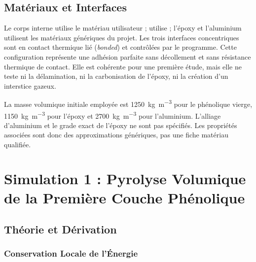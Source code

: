 \documentclass[oneside,openany]{amsdtx}
\begin{document}
\subsection{Matériaux et Interfaces}

Le corps interne  utilise le matériau utilisateur
;  utilise ; l'époxy
et l'aluminium utilisent les matériaux génériques du projet. Les trois
interfaces concentriques sont en contact thermique lié (\emph{bonded}) et
contrôlées par le programme. Cette configuration représente une adhésion parfaite
sans décollement et sans résistance thermique de contact. Elle est cohérente
pour une première étude, mais elle ne teste ni la délamination, ni la
carbonisation de l'époxy, ni la création d'un interstice gazeux.

La masse volumique initiale employée est \SI{1250}{kg.m^{-3}} pour le phénolique
vierge, \SI{1150}{kg.m^{-3}} pour l'époxy et \SI{2700}{kg.m^{-3}} pour
l'aluminium. L'alliage d'aluminium et le grade exact de l'époxy ne sont pas
spécifiés. Les propriétés associées sont donc des approximations génériques,
pas une fiche matériau qualifiée.

\clearpage
\section{Simulation 1 : Pyrolyse Volumique de la Première Couche Phénolique}

\subsection{Théorie et Dérivation}

\subsubsection{Conservation Locale de l'Énergie}
\end{document}

